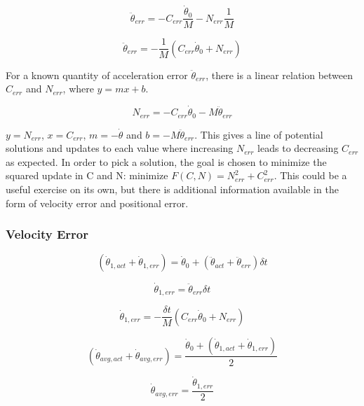 \documentclass[12pt, letterpaper, oneside, notitlepage, onecolumn]{article}
\newcommand{\bbsss}[1]{\subsubsection{#1}}
\begin{document}
\begin{equation}
\ddot{\theta}_{err} =
- C_{err} \dfrac{\dot{\theta}_{0}}{M}
- N_{err} \dfrac{1}{M}
\end{equation}

\begin{equation}
\ddot{\theta}_{err} = - \dfrac{1}{M}
(C_{err} \dot{\theta}_{0} + N_{err})
\end{equation}

For a known quantity of acceleration error $\ddot{\theta}_{err}$, there is a linear relation between $C_{err}$ and $N_{err}$, where $y = mx + b$.

\begin{equation}
N_{err} = 
- C_{err} \dot{\theta}_{0}
- M \ddot{\theta}_{err}
\end{equation}

$y = N_{err}$, $x = C_{err}$, $m = -\dot{\theta}$ and $b = - M \ddot{\theta}_{err}$. This gives a line of potential solutions and updates to each value where increasing $N_{err}$ leads to decreasing $C_{err}$ as expected. In order to pick a solution, the goal is chosen to minimize the squared update in C and N: minimize $F(C, N) = N_{err}^{2} + C_{err}^{2}$. This could be a useful exercise on its own, but there is additional information available in the form of velocity error and positional error.

\bbsss{Velocity Error}

\begin{equation}
(\dot{\theta}_{1, act} + \dot{\theta}_{1, err}) = \dot{\theta}_{0} + (\ddot{\theta}_{act} + \ddot{\theta}_{err}) \delta t
\end{equation}

\begin{equation}
\dot{\theta}_{1, err} = \ddot{\theta}_{err} \delta t
\end{equation}

\begin{equation}
\dot{\theta}_{1, err} = - \dfrac{\delta t}{M}(C_{err} \dot{\theta}_{0} + N_{err})
\end{equation}

\begin{equation}
(\dot{\theta}_{avg, act} + \dot{\theta}_{avg, err}) = \dfrac{\dot{\theta}_{0} + (\dot{\theta}_{1, act} + \dot{\theta}_{1, err})}{2}
\end{equation}

\begin{equation}
\dot{\theta}_{avg, err} = \dfrac{\dot{\theta}_{1, err}}{2}
\end{equation}
\end{document}
